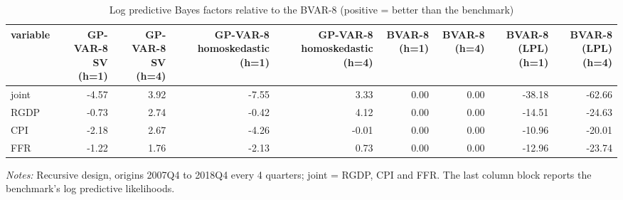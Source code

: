 \begin{table}[htbp]
\centering
\caption{Log predictive Bayes factors relative to the BVAR-8 (positive = better than the benchmark)}
\label{tab:lpbf}
\begin{tabular}{lrrrrrrrr}
\toprule
variable & GP-VAR-8 SV (h=1) & GP-VAR-8 SV (h=4) & GP-VAR-8 homoskedastic (h=1) & GP-VAR-8 homoskedastic (h=4) & BVAR-8 (h=1) & BVAR-8 (h=4) & BVAR-8 (LPL) (h=1) & BVAR-8 (LPL) (h=4) \\
\midrule
joint & -4.57 & 3.92 & -7.55 & 3.33 & 0.00 & 0.00 & -38.18 & -62.66 \\
RGDP & -0.73 & 2.74 & -0.42 & 4.12 & 0.00 & 0.00 & -14.51 & -24.63 \\
CPI & -2.18 & 2.67 & -4.26 & -0.01 & 0.00 & 0.00 & -10.96 & -20.01 \\
FFR & -1.22 & 1.76 & -2.13 & 0.73 & 0.00 & 0.00 & -12.96 & -23.74 \\
\bottomrule
\end{tabular}
\begin{minipage}{0.95\linewidth}\footnotesize\emph{Notes:} Recursive design, origins 2007Q4 to 2018Q4 every 4 quarters; joint = RGDP, CPI and FFR. The last column block reports the benchmark's log predictive likelihoods.\end{minipage}
\end{table}